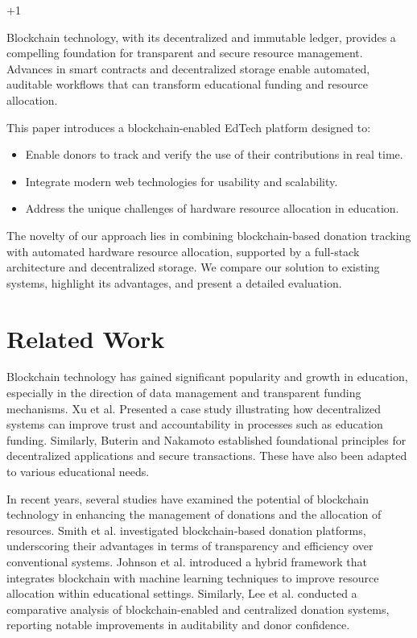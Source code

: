 +1\documentclass[conference]{IEEEtran}
\begin{document}
Blockchain technology, with its decentralized and immutable ledger, provides a compelling foundation for transparent and secure resource management. Advances in smart contracts and decentralized storage enable automated, auditable workflows that can transform educational funding and resource allocation.

This paper introduces a blockchain-enabled EdTech platform designed to:
\begin{itemize}
    \item Enable donors to track and verify the use of their contributions in real time.
    \item Integrate modern web technologies for usability and scalability.
    \item Address the unique challenges of hardware resource allocation in education.
\end{itemize}

The novelty of our approach lies in combining blockchain-based donation tracking with automated hardware resource allocation, supported by a full-stack architecture and decentralized storage. We compare our solution to existing systems, highlight its advantages, and present a detailed evaluation.

\section{Related Work}
Blockchain technology has gained significant popularity and growth in education, especially in the direction of data management and transparent funding mechanisms. Xu et al.\cite{b3} Presented a case study illustrating how decentralized systems can improve trust and accountability in processes such as education funding. Similarly, Buterin \cite{b2} and Nakamoto \cite{b1} established foundational principles for decentralized applications and secure transactions. These have also been adapted to various educational needs.

In recent years, several studies have examined the potential of blockchain technology in enhancing the management of donations and the allocation of resources. Smith et al. \cite{b12} investigated blockchain-based donation platforms, underscoring their advantages in terms of transparency and efficiency over conventional systems. Johnson et al. \cite{b13} introduced a hybrid framework that integrates blockchain with machine learning techniques to improve resource allocation within educational settings. Similarly, Lee et al. \cite{b14} conducted a comparative analysis of blockchain-enabled and centralized donation systems, reporting notable improvements in auditability and donor confidence.
\end{document}
